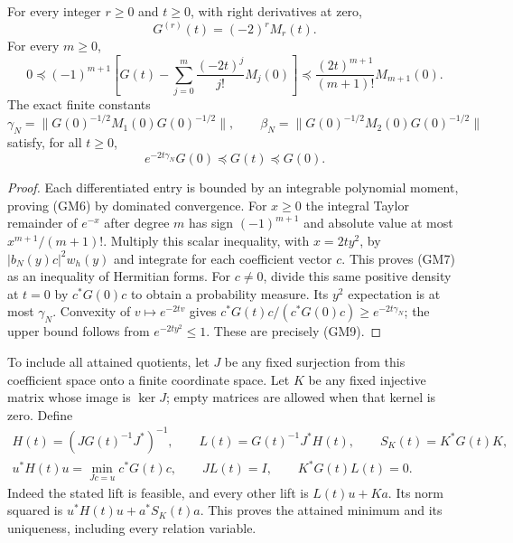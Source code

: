 \begin{theorem}
For every integer $r\geq0$ and $t\geq0$, with right derivatives at zero,
\begin{equation}\tag{GM6}
 G^{(r)}(t)=(-2)^rM_r(t).
\end{equation}
For every $m\geq0$,
\begin{equation}\tag{GM7}
 0\preceq(-1)^{m+1}
 \left[G(t)-\sum_{j=0}^m\frac{(-2t)^j}{j!}M_j(0)\right]
 \preceq\frac{(2t)^{m+1}}{(m+1)!}M_{m+1}(0).
\end{equation}
The exact finite constants
\begin{equation}\tag{GM8}
 \gamma_N=\|G(0)^{-1/2}M_1(0)G(0)^{-1/2}\|,
 \qquad
 \beta_N=\|G(0)^{-1/2}M_2(0)G(0)^{-1/2}\|
\end{equation}
satisfy, for all $t\geq0$,
\begin{equation}\tag{GM9}
 e^{-2t\gamma_N}G(0)\preceq G(t)\preceq G(0).
\end{equation}
\end{theorem}
\begin{proof}
Each differentiated entry is bounded by an integrable polynomial
moment, proving (GM6) by dominated convergence.  For $x\geq0$ the
integral Taylor remainder of $e^{-x}$ after degree $m$ has sign
$(-1)^{m+1}$ and absolute value at most $x^{m+1}/(m+1)!$.
Multiply this scalar inequality, with $x=2ty^2$, by
$|b_N(y)c|^2w_h(y)$ and integrate for each coefficient vector $c$.
This proves (GM7) as an inequality of Hermitian forms.
For $c\ne0$, divide this same positive density at $t=0$ by $c^*G(0)c$
to obtain a probability measure.  Its $y^2$ expectation is at most
$\gamma_N$.  Convexity of $v\mapsto e^{-2tv}$ gives
$c^*G(t)c/(c^*G(0)c)\geq e^{-2t\gamma_N}$; the upper bound follows
from $e^{-2ty^2}\leq1$.  These are precisely (GM9).
\end{proof}

To include all attained quotients, let $J$ be any fixed surjection
from this coefficient space onto a finite coordinate space.  Let $K$
be any fixed injective matrix whose image is $\ker J$; empty matrices
are allowed when that kernel is zero.  Define
\begin{equation}\tag{GM10}
 \begin{gathered}
 H(t)=(JG(t)^{-1}J^*)^{-1},\qquad
 L(t)=G(t)^{-1}J^*H(t),\qquad S_K(t)=K^*G(t)K,\\
 u^*H(t)u=\min_{Jc=u}c^*G(t)c,\qquad JL(t)=I,
 \qquad K^*G(t)L(t)=0.
 \end{gathered}
\end{equation}
Indeed the stated lift is feasible, and every other lift is $L(t)u+Ka$.
Its norm squared is $u^*H(t)u+a^*S_K(t)a$.  This proves the attained
minimum and its uniqueness, including every relation variable.

